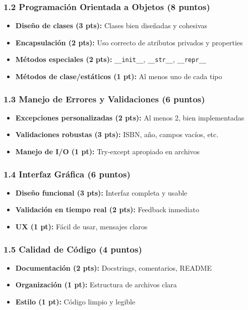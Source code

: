 \documentclass[12pt,a4paper]{article}
\begin{document}
\subsubsection{1.2 Programación Orientada a Objetos (8 puntos)}
\begin{itemize}[leftmargin=*]
    \item \textbf{Diseño de clases (3 pts):} Clases bien diseñadas y cohesivas
    \item \textbf{Encapsulación (2 pts):} Uso correcto de atributos privados y properties
    \item \textbf{Métodos especiales (2 pts):} \texttt{\_\_init\_\_}, \texttt{\_\_str\_\_}, \texttt{\_\_repr\_\_}
    \item \textbf{Métodos de clase/estáticos (1 pt):} Al menos uno de cada tipo
\end{itemize}

\subsubsection{1.3 Manejo de Errores y Validaciones (6 puntos)}
\begin{itemize}[leftmargin=*]
    \item \textbf{Excepciones personalizadas (2 pts):} Al menos 2, bien implementadas
    \item \textbf{Validaciones robustas (3 pts):} ISBN, año, campos vacíos, etc.
    \item \textbf{Manejo de I/O (1 pt):} Try-except apropiado en archivos
\end{itemize}

\subsubsection{1.4 Interfaz Gráfica (6 puntos)}
\begin{itemize}[leftmargin=*]
    \item \textbf{Diseño funcional (3 pts):} Interfaz completa y usable
    \item \textbf{Validación en tiempo real (2 pts):} Feedback inmediato
    \item \textbf{UX (1 pt):} Fácil de usar, mensajes claros
\end{itemize}

\subsubsection{1.5 Calidad de Código (4 puntos)}
\begin{itemize}[leftmargin=*]
    \item \textbf{Documentación (2 pts):} Docstrings, comentarios, README
    \item \textbf{Organización (1 pt):} Estructura de archivos clara
    \item \textbf{Estilo (1 pt):} Código limpio y legible
\end{itemize}
\end{document}
